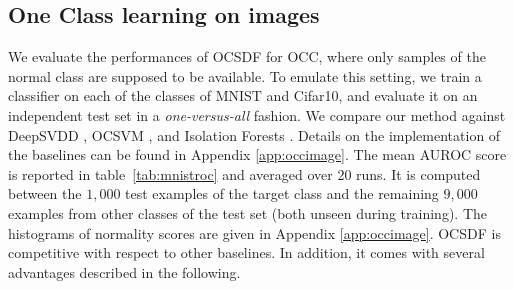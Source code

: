
\subsection{One Class learning on images}

We evaluate the performances of OCSDF for OCC, where only samples of the normal class are supposed to be available. To emulate this setting, we train a classifier on each of the classes of MNIST and Cifar10, and evaluate it on an independent test set in a \textit{one-versus-all} fashion. We compare our method against DeepSVDD \cite{ruff2018deep}, OCSVM \cite{scholkopf_support_1999}, and Isolation Forests \cite{liu2008isolation}. Details on the implementation of the baselines can be found in Appendix \ref{app:occimage}. The mean AUROC score is reported in table~\ref{tab:mnistroc} and averaged over $20$ runs. It is computed between the $1,000$ test examples of the target class and the remaining $9,000$ examples from other classes of the test set (both unseen during training). The histograms of normality scores are given in Appendix \ref{app:occimage}. OCSDF is competitive with respect to other baselines. In addition, it comes with several advantages described in the following. 




